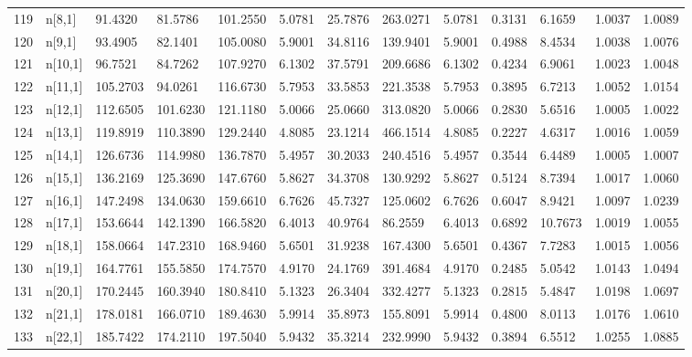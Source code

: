 \begin{table}[ht]
\begin{tabular}{rllllllllllll}
  119 & n[8,1] &  91.4320 &   81.5786 & 101.2550 &   5.0781 &    25.7876 &  263.0271 &   5.0781 &  0.3131 &  6.1659 & 1.0037 &  1.0089 \\ 
  120 & n[9,1] &  93.4905 &   82.1401 & 105.0080 &   5.9001 &    34.8116 &  139.9401 &   5.9001 &  0.4988 &  8.4534 & 1.0038 &  1.0076 \\ 
  121 & n[10,1] &  96.7521 &   84.7262 & 107.9270 &   6.1302 &    37.5791 &  209.6686 &   6.1302 &  0.4234 &  6.9061 & 1.0023 &  1.0048 \\ 
  122 & n[11,1] & 105.2703 &   94.0261 & 116.6730 &   5.7953 &    33.5853 &  221.3538 &   5.7953 &  0.3895 &  6.7213 & 1.0052 &  1.0154 \\ 
  123 & n[12,1] & 112.6505 &  101.6230 & 121.1180 &   5.0066 &    25.0660 &  313.0820 &   5.0066 &  0.2830 &  5.6516 & 1.0005 &  1.0022 \\ 
  124 & n[13,1] & 119.8919 &  110.3890 & 129.2440 &   4.8085 &    23.1214 &  466.1514 &   4.8085 &  0.2227 &  4.6317 & 1.0016 &  1.0059 \\ 
  125 & n[14,1] & 126.6736 &  114.9980 & 136.7870 &   5.4957 &    30.2033 &  240.4516 &   5.4957 &  0.3544 &  6.4489 & 1.0005 &  1.0007 \\ 
  126 & n[15,1] & 136.2169 &  125.3690 & 147.6760 &   5.8627 &    34.3708 &  130.9292 &   5.8627 &  0.5124 &  8.7394 & 1.0017 &  1.0060 \\ 
  127 & n[16,1] & 147.2498 &  134.0630 & 159.6610 &   6.7626 &    45.7327 &  125.0602 &   6.7626 &  0.6047 &  8.9421 & 1.0097 &  1.0239 \\ 
  128 & n[17,1] & 153.6644 &  142.1390 & 166.5820 &   6.4013 &    40.9764 &   86.2559 &   6.4013 &  0.6892 & 10.7673 & 1.0019 &  1.0055 \\ 
  129 & n[18,1] & 158.0664 &  147.2310 & 168.9460 &   5.6501 &    31.9238 &  167.4300 &   5.6501 &  0.4367 &  7.7283 & 1.0015 &  1.0056 \\ 
  130 & n[19,1] & 164.7761 &  155.5850 & 174.7570 &   4.9170 &    24.1769 &  391.4684 &   4.9170 &  0.2485 &  5.0542 & 1.0143 &  1.0494 \\ 
  131 & n[20,1] & 170.2445 &  160.3940 & 180.8410 &   5.1323 &    26.3404 &  332.4277 &   5.1323 &  0.2815 &  5.4847 & 1.0198 &  1.0697 \\ 
  132 & n[21,1] & 178.0181 &  166.0710 & 189.4630 &   5.9914 &    35.8973 &  155.8091 &   5.9914 &  0.4800 &  8.0113 & 1.0176 &  1.0610 \\ 
  133 & n[22,1] & 185.7422 &  174.2110 & 197.5040 &   5.9432 &    35.3214 &  232.9990 &   5.9432 &  0.3894 &  6.5512 & 1.0255 &  1.0885 \\ 

\end{tabular}
\end{table}

